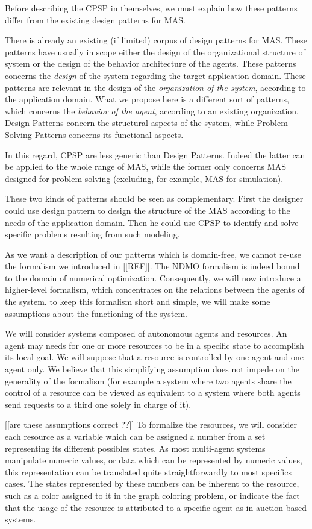 Before describing the CPSP in themselves, we must explain how these patterns differ from the existing design patterns for MAS.

There is already an existing (if limited) corpus of design patterns for MAS. These patterns have usually in scope either the design of the organizational structure of system or the design of the behavior architecture of the agents. These patterns concerns the \emph{design} of the system regarding the target application domain. These patterns are relevant in the design of the \emph{organization of the system}, according to the application domain.
What we propose here is a different sort of patterns, which concerns the \emph{behavior of the agent}, according to an existing organization. Design Patterns concern the structural aspects of the system, while Problem Solving Patterns concerns its functional aspects.

In this regard, CPSP are less generic than Design Patterns. Indeed the latter can be applied to the whole range of MAS, while the former only concerns MAS designed for problem solving (excluding, for example, MAS for simulation).

These two kinds of patterns should be seen as complementary. First the designer could use design pattern to design the structure of the MAS according to the needs of the application domain. Then he could use CPSP to identify and solve specific problems resulting from such modeling.

As we want a description of our patterns which is domain-free, we cannot re-use the formalism we introduced in [[REF]]. The NDMO formalism is indeed bound to the domain of numerical optimization.
Consequently, we will now introduce a higher-level formalism, which concentrates on the relations between the agents of the system. to keep this formalism short and simple, we will make some assumptions about the functioning of the system.

We will consider systems composed of autonomous agents and resources. An agent may needs for one or more resources to be in a specific state to accomplish its local goal. We will suppose that a resource is controlled by one agent and one agent only. We believe that this simplifying assumption does not impede on the generality of the formalism (for example a system where two agents share the control of a resource can be viewed as equivalent to a system where both agents send requests to a third one solely in charge of it).

[[are these assumptions correct ??]]
To formalize the resources, we will consider each resource as a variable which can be assigned a number from a set representing its different possibles states. As most multi-agent systems manipulate numeric values, or data which can be represented by numeric values, this representation can be translated quite straightforwardly to most specifics cases.
The states represented by these numbers can be inherent to the resource, such as a color assigned to it in the graph coloring problem, or indicate the fact that the usage of the resource is attributed to a specific agent as in auction-based systems.

